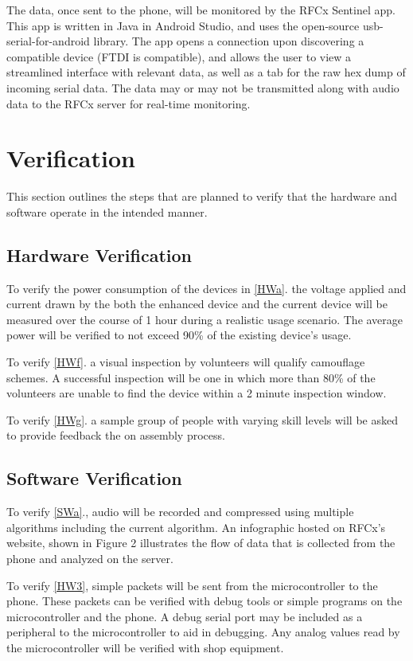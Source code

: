 \documentclass{article}
\numberwithin{figure}{section}
\numberwithin{equation}{section}
\begin{document}
{The data, once sent to the phone, will be monitored by the RFCx Sentinel app. This app is written in Java in Android Studio, and uses the open-source usb-serial-for-android library. The app opens a connection upon discovering a compatible device (FTDI is compatible), and allows the user to view a streamlined interface with relevant data, as well as a tab for the raw hex dump of incoming serial data. The data may or may not be transmitted along with audio data to the RFCx server for real-time monitoring.

\section{Verification} \label{sect:verification}
This section outlines the steps that are planned to verify that the hardware and software operate in the intended manner. 
\subsection{Hardware Verification} \label{sect:hardwareverification}
To verify the power consumption of the devices in \ref{HWa}. the voltage applied and current drawn by the both the enhanced device and the current device will be measured over the course of 1 hour during a realistic usage scenario. The average power will be verified to not exceed 90\% of the existing device’s usage.

To verify \ref{HWf}. a visual inspection by volunteers will qualify camouflage schemes. A successful inspection will be one in which more than 80\% of the volunteers are unable to find the device within a 2 minute inspection window.

To verify \ref{HWg}. a sample group of people with varying skill levels will be asked to provide feedback the on assembly process.

\subsection{Software Verification} \label{sect:softwareverification}
To verify \ref{SWa}., audio will be recorded and compressed using multiple algorithms including the current algorithm. An infographic hosted on RFCx’s website, shown in Figure 2 illustrates the flow of data that is collected from the phone and analyzed on the server.

To verify \ref{HW3}, simple packets will be sent from the microcontroller to the phone. These packets can be verified with debug tools or simple programs on the microcontroller and the phone. A debug serial port may be included as a peripheral to the microcontroller to aid in debugging. Any analog values read by the microcontroller will be verified with shop equipment.

}
\end{document}
